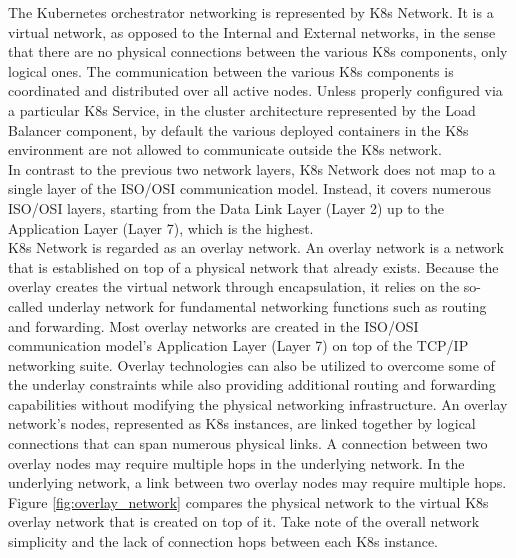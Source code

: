 The Kubernetes orchestrator networking is represented by K8s Network. It is a
virtual network, as opposed to the Internal and External networks, in the sense
that there are no physical connections between the various K8s components, only logical
ones. The communication between the various K8s components is coordinated and
distributed over all active nodes. Unless properly configured via a particular K8s
Service, in the cluster architecture represented by the Load Balancer component,
by default the various deployed containers in the K8s environment are not allowed
to communicate outside the K8s network. \\ %
In contrast to the previous two network layers, K8s Network does not map to a
single layer of the ISO/OSI communication model. Instead, it covers numerous ISO/OSI
layers, starting from the Data Link Layer (Layer 2) up to the Application Layer (Layer
7), which is the highest. \\ %
K8s Network is regarded as an overlay network. An overlay network is a network that
is established on top of a physical network that already exists. Because the
overlay creates the virtual network through encapsulation, it relies on the so-called
underlay network for fundamental networking functions such as routing and forwarding.
Most overlay networks are created in the ISO/OSI communication model's
Application Layer (Layer 7) on top of the TCP/IP networking suite. Overlay technologies
can also be utilized to overcome some of the underlay constraints while also providing
additional routing and forwarding capabilities without modifying the physical networking
infrastructure. An overlay network's nodes, represented as K8s instances, are
linked together by logical connections that can span numerous physical links. A connection
between two overlay nodes may require multiple hops in the underlying network.
In the underlying network, a link between two overlay nodes may require multiple
hops. Figure \ref{fig:overlay_network} compares the physical network to the
virtual K8s overlay network that is created on top of it. Take note of the overall
network simplicity and the lack of connection hops between each K8s instance.

